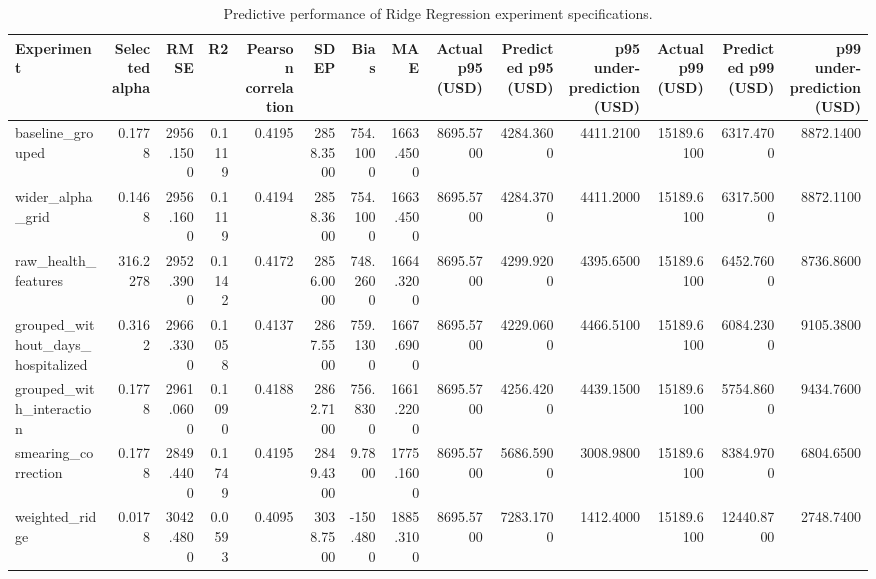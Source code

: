 \begin{table}
\caption{Predictive performance of Ridge Regression experiment specifications.}
\label{tab:04-ridge-experiment-comparison}
\begin{tabular}{lrrrrrrrrrrrrr}
\toprule
Experiment & Selected alpha & RMSE & R2 & Pearson correlation & SDEP & Bias & MAE & Actual p95 (USD) & Predicted p95 (USD) & p95 under-prediction (USD) & Actual p99 (USD) & Predicted p99 (USD) & p99 under-prediction (USD) \\
\midrule
baseline_grouped & 0.1778 & 2956.1500 & 0.1119 & 0.4195 & 2858.3500 & 754.1000 & 1663.4500 & 8695.5700 & 4284.3600 & 4411.2100 & 15189.6100 & 6317.4700 & 8872.1400 \\
wider_alpha_grid & 0.1468 & 2956.1600 & 0.1119 & 0.4194 & 2858.3600 & 754.1000 & 1663.4500 & 8695.5700 & 4284.3700 & 4411.2000 & 15189.6100 & 6317.5000 & 8872.1100 \\
raw_health_features & 316.2278 & 2952.3900 & 0.1142 & 0.4172 & 2856.0000 & 748.2600 & 1664.3200 & 8695.5700 & 4299.9200 & 4395.6500 & 15189.6100 & 6452.7600 & 8736.8600 \\
grouped_without_days_hospitalized & 0.3162 & 2966.3300 & 0.1058 & 0.4137 & 2867.5500 & 759.1300 & 1667.6900 & 8695.5700 & 4229.0600 & 4466.5100 & 15189.6100 & 6084.2300 & 9105.3800 \\
grouped_with_interaction & 0.1778 & 2961.0600 & 0.1090 & 0.4188 & 2862.7100 & 756.8300 & 1661.2200 & 8695.5700 & 4256.4200 & 4439.1500 & 15189.6100 & 5754.8600 & 9434.7600 \\
smearing_correction & 0.1778 & 2849.4400 & 0.1749 & 0.4195 & 2849.4300 & 9.7800 & 1775.1600 & 8695.5700 & 5686.5900 & 3008.9800 & 15189.6100 & 8384.9700 & 6804.6500 \\
weighted_ridge & 0.0178 & 3042.4800 & 0.0593 & 0.4095 & 3038.7500 & -150.4800 & 1885.3100 & 8695.5700 & 7283.1700 & 1412.4000 & 15189.6100 & 12440.8700 & 2748.7400 \\
\bottomrule
\end{tabular}
\end{table}
